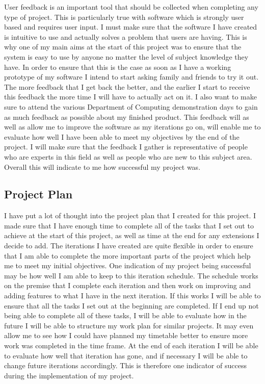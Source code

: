 User feedback is an important tool that should be collected when completing any type of project. This is particularly true with software which is strongly user based and requires user input. I must make sure that the software I have created is intuitive to use and actually solves a problem that users are having. This is why one of my main aims at the start of this project was to ensure that the system is easy to use by anyone no matter the level of subject knowledge they have. In order to ensure that this is the case as soon as I have a working prototype of my software I intend to start asking family and friends to try it out. The more feedback that I get back the better, and the earlier I start to receive this feedback the more time I will have to actually act on it. I also want to make sure to attend the various Department of Computing demonstration days to gain as much feedback as possible about my finished product. This feedback will as well as allow me to improve the software as my iterations go on, will enable me to evaluate how well I have been able to meet my objectives by the end of the project. I will make sure that the feedback I gather is representative of people who are experts in this field as well as people who are new to this subject area. Overall this will indicate to me how successful my project was.

\subsection{Project Plan}

I have put a lot of thought into the project plan that I created for this project. I made sure that I have enough time to complete all of the tasks that I set out to achieve at the start of this project, as well as time at the end for any extensions I decide to add. The iterations I have created are quite flexible in order to ensure that I am able to complete the more important parts of the project which help me to meet my initial objectives. One indication of my project being successful  may be how well I am able to keep to this iteration schedule. The schedule works on the premise that I complete each iteration and then work on improving and adding features to what I have in the next iteration. If this works I will be able to ensure that all the tasks I set out at the beginning are completed. If I end up not being able to complete all of these tasks, I will be able to evaluate how in the future I will be able to structure my work plan for similar projects. It may even allow me to see how I could have planned my timetable better to ensure more work was completed in the time frame. At the end of each iteration I will be able to evaluate how well that iteration has gone, and if necessary I will be able to change future iterations accordingly. This is therefore one indicator of success during the implementation of my project.
\pagebreak

